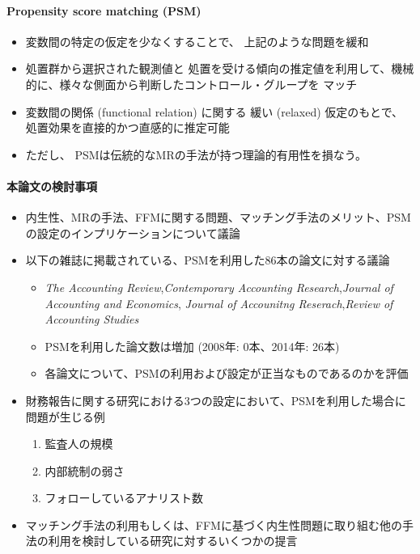 \paragraph{Propensity score matching (PSM)}
\begin{itemize}
 \item 変数間の特定の仮定を少なくすることで、
       上記のような問題を緩和
 \item 処置群から選択された観測値と
       処置を受ける傾向の推定値を利用して、機械的に、様々な側面から判断したコントロール・グループを
       マッチ
 \item 変数間の関係 (functional relation) に関する
       緩い (relaxed) 仮定のもとで、処置効果を直接的かつ直感的に推定可能
 \item ただし、
       PSMは伝統的なMRの手法が持つ理論的有用性を損なう。
\end{itemize}

\paragraph{本論文の検討事項}
\begin{itemize}
 \item 内生性、MRの手法、FFMに関する問題、マッチング手法のメリット、PSMの設定のインプリケーションについて議論
 \item 以下の雑誌に掲載されている、PSMを利用した86本の論文に対する議論
       \begin{itemize}
        \item \textit{The Accounting Review},\textit{Contemporary Accounting Research},\textit{Journal of Accounting and Economics},
              \textit{Journal of Accounitng Reserach},\textit{Review of Accounting Studies}
        \item PSMを利用した論文数は増加 (2008年: 0本、2014年: 26本)
        \item 各論文について、PSMの利用および設定が正当なものであるのかを評価
       \end{itemize}
 \item 財務報告に関する研究における3つの設定において、PSMを利用した場合に問題が生じる例
       \begin{enumerate}
        \item 監査人の規模
        \item 内部統制の弱さ
        \item フォローしているアナリスト数
       \end{enumerate}
 \item マッチング手法の利用もしくは、FFMに基づく内生性問題に取り組む他の手法の利用を検討している研究に対するいくつかの提言
\end{itemize}

